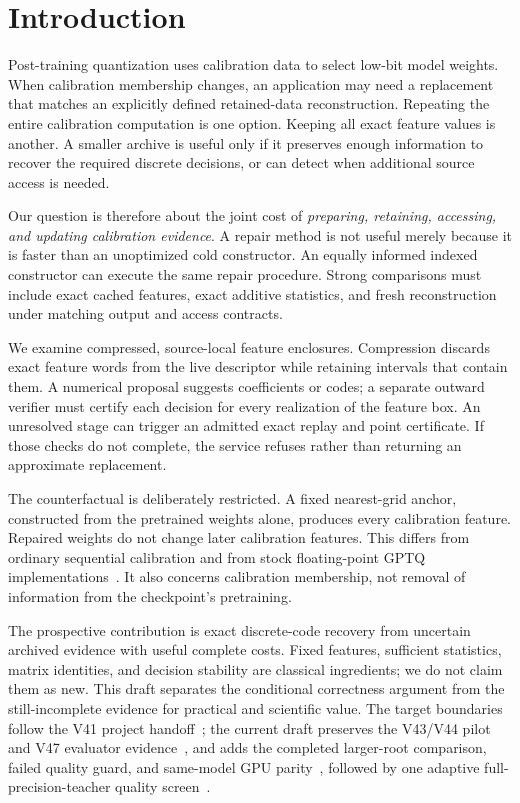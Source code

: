 \documentclass[10pt,twocolumn,letterpaper]{article}
\begin{document}
\section{Introduction}
Post-training quantization uses calibration data to select low-bit model weights.
When calibration membership changes, an application may need a replacement that
matches an explicitly defined retained-data reconstruction. Repeating the entire
calibration computation is one option. Keeping all exact feature values is
another. A smaller archive is useful only if it preserves enough information to
recover the required discrete decisions, or can detect when additional source
access is needed.

Our question is therefore about the joint cost of \emph{preparing, retaining,
accessing, and updating calibration evidence}. A repair method is not useful
merely because it is faster than an unoptimized cold constructor. An equally
informed indexed constructor can execute the same repair procedure. Strong
comparisons must include exact cached features, exact additive statistics, and
fresh reconstruction under matching output and access contracts.

We examine compressed, source-local feature enclosures. Compression discards
exact feature words from the live descriptor while retaining intervals that
contain them. A numerical proposal suggests coefficients or codes; a separate
outward verifier must certify each decision for every realization of the feature
box. An unresolved stage can trigger an admitted exact replay and point
certificate. If those checks do not complete, the service refuses rather than
returning an approximate replacement.

The counterfactual is deliberately restricted. A fixed nearest-grid anchor,
constructed from the pretrained weights alone, produces every calibration
feature. Repaired weights do not change later calibration features. This differs
from ordinary sequential calibration and from stock floating-point GPTQ
implementations~\cite{gptq}. It also concerns calibration membership, not removal
of information from the checkpoint's pretraining.

The prospective contribution is exact discrete-code recovery from uncertain
archived evidence with useful complete costs. Fixed features, sufficient
statistics, matrix identities, and decision stability are classical ingredients;
we do not claim them as new. This draft separates the conditional correctness
argument from the still-incomplete evidence for practical and scientific value.
The target boundaries follow the V41 project handoff~\cite{boundaries};
the current draft preserves the V43/V44 pilot and V47 evaluator evidence~\cite{v43,v44,v47},
and adds the completed larger-root comparison, failed quality guard, and
same-model GPU parity~\cite{v58terminal}, followed by one adaptive
full-precision-teacher quality screen~\cite{v59terminal}.
\end{document}

